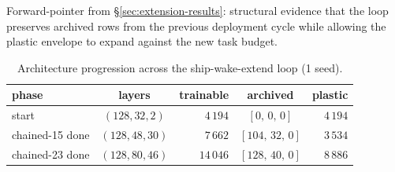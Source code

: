 \documentclass[11pt]{article}
\begin{document}
Forward-pointer from \S\ref{sec:extension-results}: structural
evidence that the loop preserves archived rows from the previous
deployment cycle while allowing the plastic envelope to expand
against the new task budget.

\begin{table}[h]
  \centering
  \caption{Architecture progression across the ship-wake-extend loop
           (1 seed).}
  \label{tab:supp-extension}
  \begin{tabular}{lcrcr}
    \toprule
    phase                & layers          & trainable    & archived             & plastic       \\
    \midrule
    start                & $(128, 32, 2)$  & $4\,194$     & $[0,\,0,\,0]$        & $4\,194$      \\
    chained-15 done      & $(128, 48, 30)$ & $7\,662$     & $[104,\,32,\,0]$     & $3\,534$      \\
    chained-23 done      & $(128, 80, 46)$ & $14\,046$    & $[128,\,40,\,0]$     & $8\,886$      \\
    \bottomrule
  \end{tabular}
\end{table}




\end{document}
